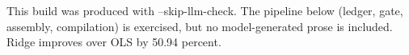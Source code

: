 This build was produced with --skip-llm-check. The pipeline below (ledger, gate, assembly, compilation) is exercised, but no model-generated prose is included. Ridge improves over OLS by 50.94 percent.
